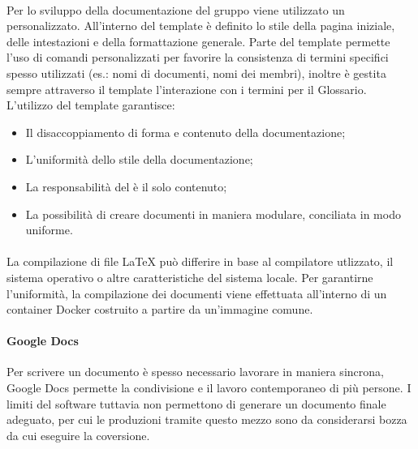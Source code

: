 \paragraph{}
Per lo sviluppo della documentazione del gruppo viene utilizzato un   personalizzato. All'interno del template è definito lo stile della pagina iniziale, delle intestazioni e della formattazione generale.
Parte del template permette l'uso di comandi personalizzati per favorire la consistenza di termini specifici spesso utilizzati (es.: nomi di documenti, nomi dei membri), inoltre è gestita sempre attraverso il template l'interazione con i termini per il Glossario.\\
L'utilizzo del template garantisce:
\begin{itemize}
  \item Il disaccoppiamento di forma e contenuto della documentazione;
  \item L'uniformità dello stile della documentazione;
  \item La responsabilità del \Redattore è il solo contenuto;
  \item La possibilità di creare documenti in maniera modulare, conciliata in modo uniforme.
\end{itemize}

\paragraph{}
La compilazione di file LaTeX può differire in base al compilatore utlizzato, il sistema operativo o altre caratteristiche del sistema locale. Per garantirne l'uniformità, la compilazione dei documenti viene effettuata all'interno di un container Docker costruito a partire da un'immagine comune.

\paragraph{Google Docs}
Per scrivere un documento è spesso necessario lavorare in maniera sincrona, Google Docs permette la condivisione e il lavoro contemporaneo di più persone. I limiti del software tuttavia non permettono di generare un documento finale adeguato, per cui le produzioni tramite questo mezzo sono da considerarsi bozza da cui eseguire la coversione.

